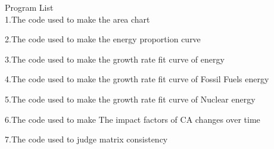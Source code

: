 \documentclass{mcmthesis}
\begin{document}
%


	
\begin{appendices}
	Program List\\
	1.The code used to make the area chart
	
	
	
	
	
	2.The code used to make the energy proportion curve
	
	3.The code used to make the growth rate fit curve of energy
	
	
	
	
	
	4.The code used to make the growth rate fit curve of Fossil Fuels energy
	
	5.The code used to make the growth rate fit curve of Nuclear energy
	
	6.The code used to make The impact factors of CA changes over time
	
	7.The code used to judge matrix consistency 
	
\end{appendices}
\end{document}

